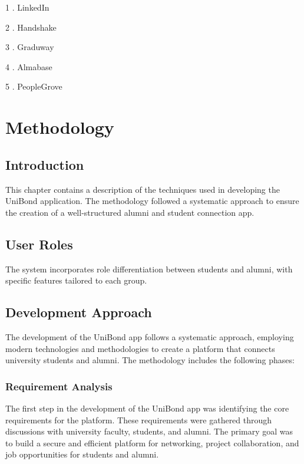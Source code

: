 \documentclass[12pt, a4paper]{report}
\begin{document}
\item 1
. LinkedIn\cite{linkedin}
 
\item 2
. Handshake\cite{handshake}

\item 3
. Graduway\cite{graduway}

\item 4
. Almabase\cite{almabase}

\item 5
. PeopleGrove \cite{peoplegrove}

\newpage


\chapter{Methodology}

\section{Introduction}
This chapter contains a description of the techniques used in developing the UniBond application. The methodology followed a systematic approach to ensure the creation of a well-structured alumni and student connection app.



\section{User Roles}
The system incorporates role differentiation between students and alumni, with specific features tailored to each group.

\section{Development Approach}
The development of the UniBond app follows a systematic approach, employing modern technologies and methodologies to create a platform that connects university students and alumni. The methodology includes the following phases:

\subsection{Requirement Analysis}
The first step in the development of the UniBond app was identifying the core requirements for the platform. These requirements were gathered through discussions with university faculty, students, and alumni. The primary goal was to build a secure and efficient platform for networking, project collaboration, and job opportunities for students and alumni.
\end{document}
